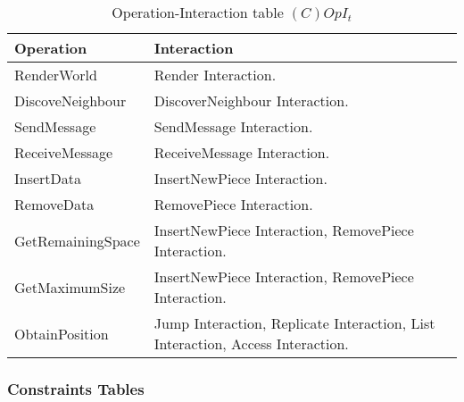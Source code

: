 \begin{table}[H]
	\centering
	\begin{tabular}{|p{4cm}|p{8cm}|}
			\hline
			\textbf{Operation} & \textbf{Interaction} \\
			\hline
			RenderWorld & Render Interaction. \\
			\hline
			DiscoveNeighbour & DiscoverNeighbour Interaction. \\
			\hline
			SendMessage & SendMessage Interaction. \\
			\hline
			ReceiveMessage & ReceiveMessage Interaction. \\
			\hline
			InsertData & InsertNewPiece Interaction. \\
			\hline
			RemoveData &  RemovePiece Interaction. \\
			\hline
			GetRemainingSpace & InsertNewPiece Interaction, RemovePiece Interaction.  \\
			\hline
			GetMaximumSize & InsertNewPiece Interaction, RemovePiece Interaction.  \\
			\hline
			ObtainPosition & Jump Interaction, Replicate Interaction, List
			Interaction, Access Interaction.  \\
			\hline
		\end{tabular}
	\caption{Operation-Interaction table $(C)OpI_t$}
	\label{tab:opit}
\end{table}

\subsubsection{Constraints Tables}

